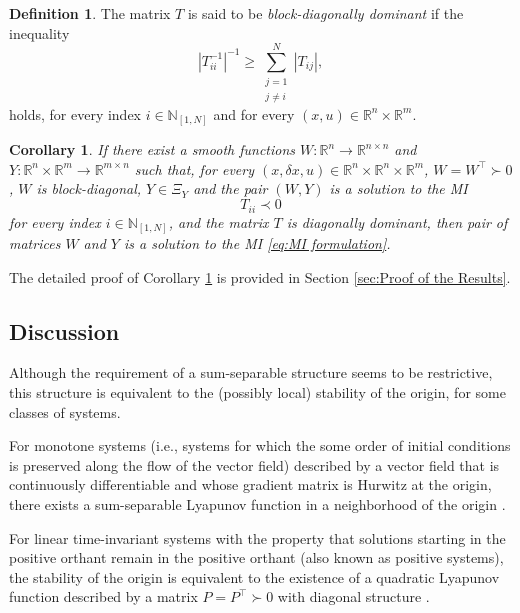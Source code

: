 \documentclass[10pt,twocolumn,twoside]{IEEEtran}
\theoremstyle{plain}
\newtheorem{corollary}[theorem]{Corollary}
\theoremstyle{definition}
\newtheorem{definition}[theorem]{Definition}
\theoremstyle{remark}
\begin{document}
\begin{definition}\label{def:}
	The matrix $T$ is said to be \emph{block-diagonally dominant} if the inequality
	\begin{equation}\label{eq:BDD}
		|T_{ii}^{-1}|^{-1}\geq\sum_{\substack{j=1\\ j\neq i}}^N|T_{ij}|,
	\end{equation}
	holds, for every index $i\in\mathbb{N}_{[1,N]}$ and for every $(x,u)\in\mathbb{R}^n\times\mathbb{R}^m$.
\end{definition}

\begin{corollary}\label{cor:distributed computation}
	 If there exist a smooth functions $W:\mathbb{R}^n\to\mathbb{R}^{n\times n}$ and $Y:\mathbb{R}^n\times\mathbb{R}^m\to\mathbb{R}^{m\times n}$ such that, for every $(x,\delta x,u)\in\mathbb{R}^n\times\mathbb{R}^n\times\mathbb{R}^m$, $W=W^\top\succ0$, $W$ is block-diagonal, $Y\in\Xi_Y$ and the pair $(W,Y)$ is a solution to the MI
	\begin{equation}\label{eq:MI formulation:i}
		T_{ii}\prec 0
	\end{equation}
	for every index $i\in\mathbb{N}_{[1,N]}$, and the matrix $T$ is diagonally dominant, then pair of matrices $W$ and $Y$ is a solution to the MI \eqref{eq:MI formulation}.
\end{corollary}

The detailed proof of Corollary \ref{cor:distributed computation} is provided in Section \ref{sec:Proof of the Results}.

\subsection{Discussion}

Although the requirement of a sum-separable structure seems to be restrictive, this structure is equivalent to the (possibly local) stability of the origin, for some classes of systems.

For monotone systems (i.e., systems for which the some order of initial conditions is preserved along the flow of the vector field) described by a vector field that is continuously differentiable and whose gradient matrix is Hurwitz at the origin, there exists a sum-separable Lyapunov function in a neighborhood of the origin \cite[Theorem 3.4]{Dirr2015}. 

For linear time-invariant systems with the property that solutions starting in the positive orthant remain in the positive orthant (also known as positive systems), the stability of the origin is equivalent to the existence of a quadratic Lyapunov function described by a matrix $P=P^\top\succ0$ with diagonal structure \cite{Tanaka2011}. 
\end{document}

